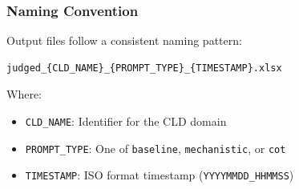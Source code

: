 \documentclass{article}
\begin{document}
\subsubsection{Naming Convention}

Output files follow a consistent naming pattern:
\begin{verbatim}
judged_{CLD_NAME}_{PROMPT_TYPE}_{TIMESTAMP}.xlsx
\end{verbatim}

Where:
\begin{itemize}
    \item \texttt{CLD\_NAME}: Identifier for the CLD domain
    \item \texttt{PROMPT\_TYPE}: One of \texttt{baseline}, \texttt{mechanistic}, or \texttt{cot}
    \item \texttt{TIMESTAMP}: ISO format timestamp (\texttt{YYYYMMDD\_HHMMSS})
\end{itemize}
\end{document}
